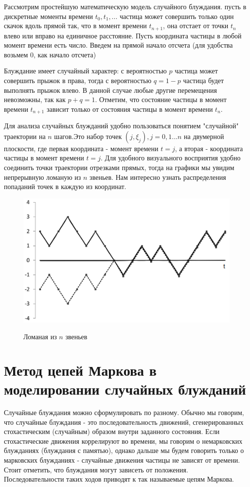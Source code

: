 \documentclass[a4paper]{report}
\begin{document}
Рассмотрим  простейшую математическую модель случайного блуждания. пусть в дискретные моменты времени $t_{0}, t_{1}, ...$ частица может совершить только один скачок вдоль прямой так, что в момент времени $t_{n+1}$, она отстает от точки $t_{n}$ влево или вправо на единичное расстояние. Пусть координата частицы в любой момент времени есть число. Введем на прямой начало отсчета (для удобства возьмем 0, как начало отсчета)

Блуждание имеет случайный характер: с вероятностью $p$ частица может совершить прыжок в права, тогда с вероятностью $q = 1 - p$ частица будет выполнять прыжок влево. В данной случае любые другие перемещения невозможны, так как $p + q = 1$. Отметим, что состояние частицы в момент времени $t_{n+1}$ зависит только от состояния частицы в момент времени $t_{n}$.

Для анализа случайных блужданий удобно пользоваться понятием "случайной" траектории на $n$ шагов.Это набор точек $(j, \xi_{j}), j=0,1...n$ на двумерной плоскости, где первая координата - момент времени $t=j$, а вторая - координата частицы в момент времени $t=j$. Для удобного визуального восприятия удобно соединить точки траектории отрезками прямых, тогда на графики мы увидим непрерывную ломаную из $n$ звеньев. Нам интересно узнать распределения попаданий точек в каждую из координат.

\begin{figure}
  \centering
  \includegraphics[]{img1.png}\\
  \caption{Ломаная из $n$ звеньев}\label{fig:1}
\end{figure}


\section{Метод цепей Маркова в моделировании случайных блужданий}
Случайные блуждания можно сформулировать по разному. Обычно мы говорим, что случайные блуждания - это последовательность движений, сгенерированных стохастическим (случайным) образом внутри заданного состояния.
Если стохастические движения коррелируют во времени, мы говорим о немарковских блужданиях (блуждания с памятью), однако дальше мы будем говорить только о марковских блужданиях - случайные движения частицы не зависят от времени.
Стоит отметить, что блуждания могут зависеть от положения. Последовательности таких ходов приводят к так называемые цепям Маркова.
\end{document}
